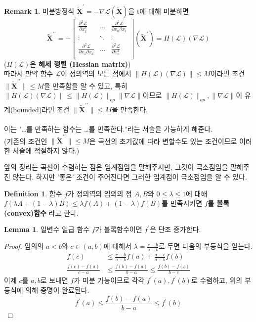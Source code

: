 \documentclass[a4paper,20pt]{article}
\theoremstyle{definition}
\newtheorem{definition}{Definition}[section]
\newtheorem{lemma}[theorem]{Lemma}
\newtheorem*{remark}{Remark}
\newcommand{\curve}[1][X]{\tilde{\mathbf{#1}}}
\begin{document}
\begin{remark}
미분방정식 $\curve^{\prime}=-\nabla\mathcal{L}(\curve)$을 t에 대해 미분하면
$$
\curve^{\prime \prime}= -\left[ 
	\begin{array}{ccc}
	\frac{\partial^{2}\mathcal{L}}{\partial x_{1}^{2}} & \ldots & \frac{\partial^{2}\mathcal{L}}{\partial x_{n} \partial x_{1}} \\
	\vdots & \ddots & \vdots \\
	\frac{\partial^{2}\mathcal{L}}{\partial x_{1} \partial x_{n}} & \ldots & \frac{\partial^{2}\mathcal{L}}{\partial x_{n}^{2}} \\
	\end{array}
\right] (\curve^{\prime})
=H(\mathcal{L})(\nabla\mathcal{L})
$$
($H(\mathcal{L})$은 \textbf{헤세 행렬 (Hessian matrix)}) \\
따라서 만약 함수 $\mathcal{L}$이 정의역의 모든 점에서 $\|H(\mathcal{L})(\nabla\mathcal{L})\|\leq M$이라면 조건 $\|\curve^{\prime \prime}\|\leq M$을 만족함을 알 수 있고, 특히 $\|H(\mathcal{L})(\nabla\mathcal{L})\|\leq \|H(\mathcal{L})\|_{op}\|\nabla\mathcal{L}\|$이므로 $\|H(\mathcal{L})\|_{op}, \|\nabla\mathcal{L}\|$이 유계(bounded)라면 조건 $\|\curve^{\prime \prime}\|\leq M$을 만족한다.
\\\\
이는 "\ldots 를 만족하는 함수는 \ldots 를 만족한다."라는 서술을 가능하게 해준다. \\
(기존의 조건인 $\|\curve^{\prime \prime}\|\leq M$은 곡선의 초기값에 따라 변할수도 있는 조건이므로 이러한 서술에 적절하지 않다.)

\end{remark}


앞의 정리는 곡선이 수렴하는 점은 임계점임을 말해주지만, 그것이 극소점임을 말해주진 않는다. 	하지만 '좋은' 조건이 주어진다면 그러한 임계점이 극소점임을 알 수 있다.

\begin{definition}
함수 $f$가 정의역의 임의의 점 $A,B$와 $0\leq \lambda \leq 1$에 대해 \\ $f(\lambda A + (1-\lambda) B) \leq \lambda f(A) + (1-\lambda) f(B)$를 만족시키면 $f$를 \textbf{볼록(convex)함수} 라고 한다.
\end{definition}

\begin{lemma}
일변수 일급 함수 $f$가 볼록함수이면 $f^{\prime}$은 단조 증가한다.
\end{lemma}
\begin{proof}
임의의 $a<b$와 $c \in (a,b)$에 대해서 $\lambda=\frac{c-b}{a-b}$로 두면 다음의 부등식을 얻는다.
\begin{align*}
f(c)&\leq\frac{c-b}{a-b}f(a)+\frac{a-c}{a-b}f(b) \\
\frac{f(c)-f(a)}{c-a}&\leq\frac{f(b)-f(a)}{b-a}\leq\frac{f(b)-f(c)}{b-c}
\end{align*}
이제 $c$를 $a,b$로 보내면 $f$가 미분 가능이므로 각각 $f^{\prime}(a),f^{\prime}(b)$로 수렴하고, 위의 부등식에 의해 증명이 완료된다.
$$f^{\prime}(a)\leq\frac{f(b)-f(a)}{b-a}\leq f^{\prime}(b)$$

\end{proof}
\end{document}
